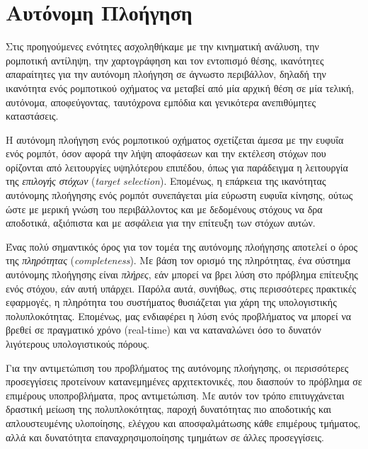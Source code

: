 \section{Αυτόνομη Πλοήγηση} \label{sec:autonomous_navigation}
Στις προηγούμενες ενότητες ασχοληθήκαμε με την κινηματική ανάλυση, την ρομποτική αντίληψη, την χαρτογράφηση και τον εντοπισμό θέσης, ικανότητες απαραίτητες για την αυτόνομη πλοήγηση σε άγνωστο περιβάλλον, δηλαδή την ικανότητα ενός ρομποτικού οχήματος να μεταβεί από μία αρχική θέση σε μία τελική, αυτόνομα, αποφεύγοντας, ταυτόχρονα εμπόδια και γενικότερα ανεπιθύμητες καταστάσεις.

\bigskip
Η αυτόνομη πλοήγηση ενός ρομποτικού οχήματος σχετίζεται άμεσα με την ευφυΐα ενός ρομπότ, όσον αφορά την λήψη αποφάσεων και την εκτέλεση στόχων που ορίζονται από λειτουργίες υψηλότερου επιπέδου, όπως για παράδειγμα η λειτουργία της \textit{επιλογής στόχων} (\textit{target selection}). Επομένως, η επάρκεια της ικανότητας αυτόνομης πλοήγησης ενός ρομπότ συνεπάγεται μία εύρωστη ευφυΐα κίνησης, ούτως ώστε με μερική γνώση του περιβάλλοντος και με δεδομένους στόχους να δρα αποδοτικά, αξιόπιστα και με ασφάλεια για την επίτευξη των στόχων αυτών.

\bigskip
Ένας πολύ σημαντικός όρος για τον τομέα της αυτόνομης πλοήγησης αποτελεί ο όρος της \textit{πληρότητας} (\textit{completeness}). Με βάση τον ορισμό της πληρότητας, ένα σύστημα αυτόνομης πλοήγησης είναι \textit{πλήρες}, εάν μπορεί να βρει λύση στο πρόβλημα επίτευξης ενός στόχου, εάν αυτή υπάρχει. Παρόλα αυτά, συνήθως, στις περισσότερες πρακτικές εφαρμογές, η πληρότητα του συστήματος θυσιάζεται για χάρη της υπολογιστικής πολυπλοκότητας. Επομένως, μας ενδιαφέρει η λύση ενός προβλήματος να μπορεί να βρεθεί σε πραγματικό χρόνο (real-time) και να καταναλώνει όσο το δυνατόν λιγότερους υπολογιστικούς πόρους.

\bigskip
Για την αντιμετώπιση του προβλήματος της αυτόνομης πλοήγησης, οι περισσότερες προσεγγίσεις προτείνουν κατανεμημένες αρχιτεκτονικές, που διασπούν το πρόβλημα σε επιμέρους υποπροβλήματα, προς αντιμετώπιση. Με αυτόν τον τρόπο επιτυγχάνεται δραστική μείωση της πολυπλοκότητας, παροχή δυνατότητας πιο αποδοτικής και απλουστευμένης υλοποίησης, ελέγχου και αποσφαλμάτωσης κάθε επιμέρους τμήματος, αλλά και δυνατότητα επαναχρησιμοποίησης τμημάτων σε άλλες προσεγγίσεις.

